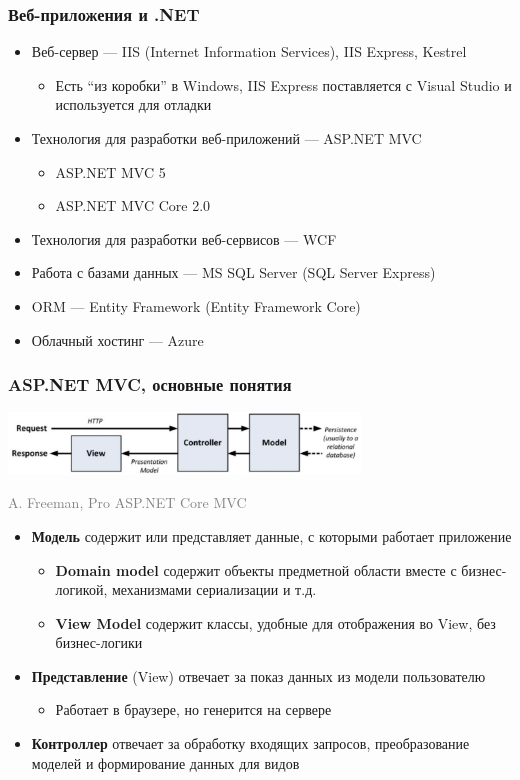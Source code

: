 \documentclass[xetex,mathserif,serif]{beamer}
\newcommand{\attribution}[1] {
	\begin{flushright}\begin{scriptsize}\textcolor{gray}{#1}\end{scriptsize}\end{flushright}
}
\begin{document}
	\begin{frame}
		\frametitle{Веб-приложения и .NET}
		\begin{itemize}
			\item Веб-сервер --- IIS (Internet Information Services), IIS Express, Kestrel
			\begin{itemize}
				\item Есть ``из коробки'' в Windows, IIS Express поставляется с Visual Studio и используется для отладки
			\end{itemize}
			\item Технология для разработки веб-приложений --- ASP.NET MVC
			\begin{itemize}
				\item ASP.NET MVC 5
				\item ASP.NET MVC Core 2.0
			\end{itemize}
			\item Технология для разработки веб-сервисов --- WCF
			\item Работа с базами данных --- MS SQL Server (SQL Server Express)
			\item ORM --- Entity Framework (Entity Framework Core)
			\item Облачный хостинг --- Azure
		\end{itemize}
	\end{frame}

	\begin{frame}
		\frametitle{ASP.NET MVC, основные понятия}
		\begin{center}
			\includegraphics[width=0.7\textwidth]{mvc.png}
			\vspace{-5mm}
			\attribution{\textcopyright A. Freeman, Pro ASP.NET Core MVC}
		\end{center}

		\vspace{-5mm}

		\begin{itemize}
			\item \textbf{Модель} содержит или представляет данные, с которыми работает приложение
			\begin{itemize}
				\item \textbf{Domain model} содержит объекты предметной области вместе с бизнес-логикой, механизмами сериализации и т.д.
				\item \textbf{View Model} содержит классы, удобные для отображения во View, без бизнес-логики
			\end{itemize}
			\item \textbf{Представление} (View) отвечает за показ данных из модели пользователю
			\begin{itemize}
				\item Работает в браузере, но генерится на сервере
			\end{itemize}
			\item \textbf{Контроллер} отвечает за обработку входящих запросов, преобразование моделей и формирование данных для видов
		\end{itemize}
	\end{frame}
\end{document}
